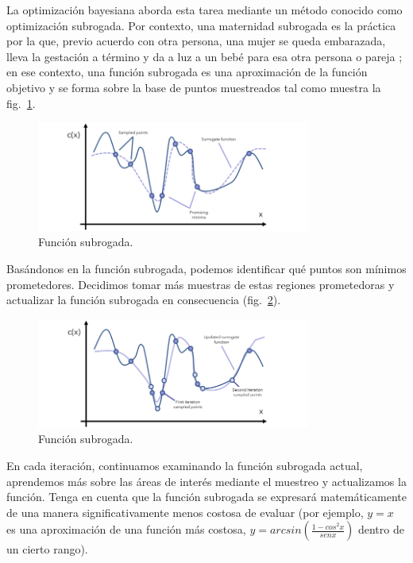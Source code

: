 \documentclass[a4paper,12pt]{article}
\begin{document}
La optimización bayesiana aborda esta tarea mediante un método conocido como optimización subrogada. Por contexto, una maternidad subrogada es la práctica por la que, previo acuerdo con otra persona, una mujer se queda embarazada, lleva la gestación a término y da a luz a un bebé para esa otra persona o pareja \citep{vientre_alquiler}; en ese contexto, una función subrogada es una aproximación de la función objetivo y se forma sobre la base de puntos muestreados tal como muestra la fig.~\ref{fig:bayes2}.

\begin{figure}[H]
	\begin{center}
	\includegraphics[width=0.8\textwidth]{bayes_opt_2.png}
  	\caption{Función subrogada.}
  	\label{fig:bayes2}
  	\end{center}
\end{figure}

Basándonos en la función subrogada, podemos identificar qué puntos son mínimos prometedores. Decidimos tomar más muestras de estas regiones prometedoras y actualizar la función subrogada en consecuencia (fig.~\ref{fig:bayes3}).

\begin{figure}[H]
	\begin{center}
	\includegraphics[width=0.8\textwidth]{bayes_opt_3.png}
  	\caption{Función subrogada.}
  	\label{fig:bayes3}
  	\end{center}
\end{figure}

En cada iteración, continuamos examinando la función subrogada actual, aprendemos más sobre las áreas de interés mediante el muestreo y actualizamos la función. Tenga en cuenta que la función subrogada se expresará matemáticamente de una manera significativamente menos costosa de evaluar (por ejemplo, $y=x$ es una aproximación de una función más costosa, $y = arcsin \left( \frac{1-cos^2x}{sen x} \right)$ dentro de un cierto rango).
\end{document}
